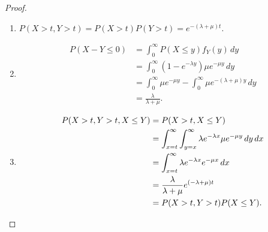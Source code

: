 \documentclass[10pt]{book}
\begin{document}
\begin{proof}\leavevmode
    \begin{enumerate}
        \item $P(X > t, Y > t) = P(X > t) P(Y > t) = e^{-(\lambda + \mu)t}$.
        \item \begin{align*}
            P(X - Y \leq 0) & = \int_0^\infty P(X\leq y) f_Y(y)\,dy \\
            & = \int_0^\infty (1 - e^{-\lambda y}) \mu e^{-\mu y}\,dy \\
            & = \int_0^\infty \mu e^{-\mu y} - \int_0^\infty \mu e^{-(\lambda + \mu) y} \,dy \\
            & = \frac{\lambda}{\lambda + \mu}.
        \end{align*}
    \item \begin{align*}
        P(X > t,Y > t,X \leq Y) & = P(X > t, X\leq Y)\\
         & = \int_{x = t}^\infty \int_{y = x}^\infty \lambda e^{-\lambda x} \mu e^{-\mu y}\,dy\,dx \\
         & = \int_{x = t}^\infty \lambda e^{-\lambda x} e^{-\mu x} \,dx \\
         & = \frac{\lambda}{\lambda + \mu} e^{(-\lambda + \mu) t} \\
         & = P(X > t,Y>t) P(X \leq Y). \qedhere
    \end{align*}
    \end{enumerate}
\end{proof}

\end{document}
